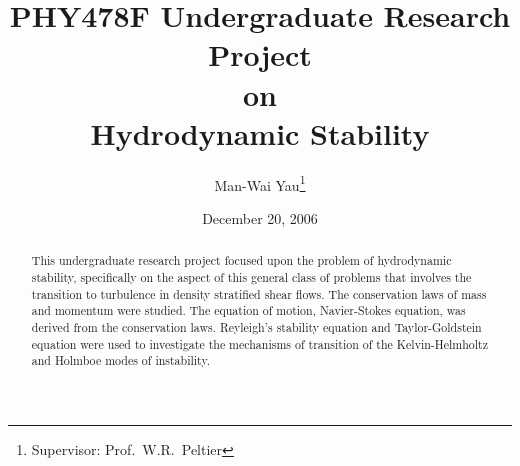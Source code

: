 \documentclass[12pt]{report}
\title{PHY478F Undergraduate Research Project\\on\\Hydrodynamic Stability}
\author{Man-Wai Yau\thanks{Supervisor: Prof.~W.R.~Peltier}}
\date{December 20, 2006}
\begin{document}
\maketitle
\begin{abstract}
This undergraduate research project focused upon the problem of
hydrodynamic stability, specifically on the aspect of this general
class of problems that involves the transition to turbulence in
density stratified shear flows. The conservation laws of mass and
momentum were studied. The equation of motion, Navier-Stokes
equation, was derived from the conservation laws. Reyleigh's
stability equation and Taylor-Goldstein equation were used to
investigate the mechanisms of transition of the Kelvin-Helmholtz and
Holmboe modes of instability.
\end{abstract}
\tableofcontents














\end{document}

